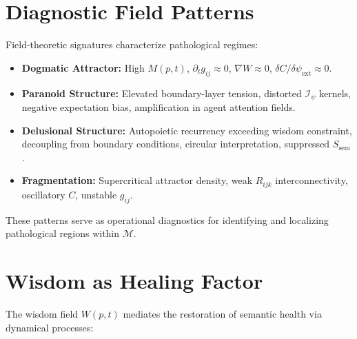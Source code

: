 
\section{Diagnostic Field Patterns}
\label{16.4:diagnostic_field_patterns}

Field-theoretic signatures characterize pathological regimes:

\begin{itemize}

    \item \textbf{Dogmatic Attractor:} High $M(p,t)$, $\partial_t g_{ij} \approx 0$, $\nabla W \approx 0$, $\delta C / \delta \psi_{\text{ext}} \approx 0$.

    \item \textbf{Paranoid Structure:} Elevated boundary-layer tension, distorted $\mathcal{I}_{\psi}$ kernels, negative expectation bias, amplification in agent attention fields.

    \item \textbf{Delusional Structure:} Autopoietic recurrency exceeding wisdom constraint, decoupling from boundary conditions, circular interpretation, suppressed $S_{\text{sem}}$.

    \item \textbf{Fragmentation:} Supercritical attractor density, weak $R_{ijk}$ interconnectivity, oscillatory $C$, unstable $g_{ij}$.

\end{itemize}

These patterns serve as operational diagnostics for identifying and localizing pathological regions within $\mathcal{M}$.


\section{Wisdom as Healing Factor}
\label{16.5:wisdom_as_healing_factor}

The wisdom field $W(p,t)$ mediates the restoration of semantic health via dynamical processes:

